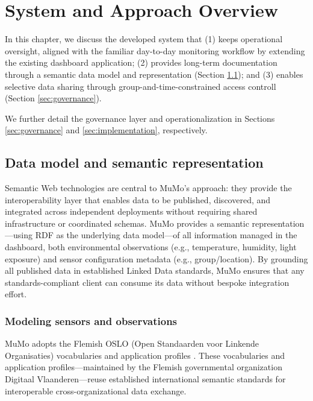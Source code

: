 \documentclass{ceurart}
\begin{document}
\section{System and Approach Overview}\label{sec:approach}

In this chapter, we discuss the developed system that (1) keeps
operational oversight, aligned with the familiar day-to-day monitoring
workflow by extending the existing dashboard application; (2) provides
long-term documentation through a semantic data model and representation
(Section \ref{sec:datamodel}); and (3) enables selective data sharing
through group-and-time-constrained access controll (Section
\ref{sec:governance}).

We further detail the governance layer and operationalization in
Sections \ref{sec:governance} and \ref{sec:implementation},
respectively.

\subsection{Data model and semantic representation}\label{sec:datamodel}

Semantic Web technologies are central to MuMo's approach: they provide
the interoperability layer that enables data to be published,
discovered, and integrated across independent deployments without
requiring shared infrastructure or coordinated schemas. MuMo provides a
semantic representation---using RDF as the underlying data model---of
all information managed in the dashboard, both environmental
observations (e.g., temperature, humidity, light exposure) and sensor
configuration metadata (e.g., group/location). By grounding all
published data in established Linked Data standards, MuMo ensures that
any standards-compliant client can consume its data without bespoke
integration effort.

\subsubsection{Modeling sensors and
observations}\label{modeling-sensors-and-observations}

MuMo adopts the Flemish OSLO (Open Standaarden voor Linkende
Organisaties) vocabularies and application profiles
\citep{buyle2016oslo}. These vocabularies and application
profiles---maintained by the Flemish governmental organization Digitaal
Vlaanderen---reuse established international semantic standards for
interoperable cross-organizational data exchange.
\end{document}
